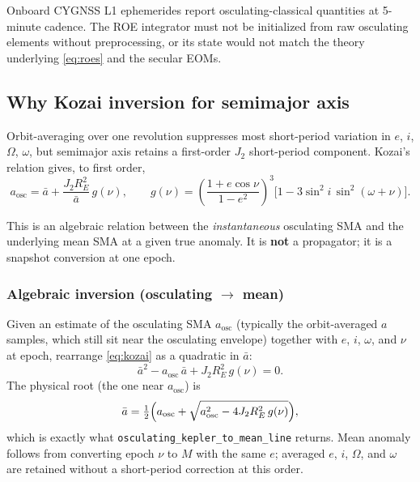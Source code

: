 \documentclass[11pt]{article}
\begin{document}
Onboard CYGNSS L1 ephemerides report osculating-classical quantities at 5-minute cadence. The ROE integrator must not be initialized from raw osculating elements without preprocessing, or its state would not match the theory underlying \eqref{eq:roes} and the secular EOMs.

\subsection{Why Kozai inversion for semimajor axis}

Orbit-averaging over one revolution suppresses most short-period variation in $e$, $i$, $\Omega$, $\omega$, but semimajor axis retains a first-order $J_2$ short-period component. Kozai's relation gives, to first order,
\begin{equation}
a_\mathrm{osc} = \bar{a} + \frac{J_2 R_E^2}{\bar{a}}\,g(\nu),
\qquad
g(\nu) =
\left(\frac{1+e\cos\nu}{1-e^2}\right)^{\!3}
\bigl[1 - 3\sin^2 i\,\sin^2(\omega+\nu)\bigr].
\label{eq:kozai}
\end{equation}

This is an algebraic relation between the \emph{instantaneous} osculating SMA and the underlying mean SMA at a given true anomaly. It is \textbf{not} a propagator; it is a snapshot conversion at one epoch.

\subsubsection{Algebraic inversion (osculating $\to$ mean)}

Given an estimate of the osculating SMA $a_\mathrm{osc}$ (typically the orbit-averaged $a$ samples, which still sit near the osculating envelope) together with $e$, $i$, $\omega$, and $\nu$ at epoch, rearrange \eqref{eq:kozai} as a quadratic in $\bar{a}$:
\begin{equation}
\bar{a}^2 - a_\mathrm{osc}\,\bar{a} + J_2 R_E^2\,g(\nu) = 0.
\end{equation}
The physical root (the one near $a_\mathrm{osc}$) is
\begin{equation}
\bar{a} = \tfrac{1}{2}\Bigl(a_\mathrm{osc} + \sqrt{a_\mathrm{osc}^2 - 4 J_2 R_E^2\,g(\nu)}\Bigr),
\end{equation}
which is exactly what \texttt{osculating\_kepler\_to\_mean\_line} returns. Mean anomaly follows from converting epoch $\nu$ to $M$ with the same $e$; averaged $e$, $i$, $\Omega$, and $\omega$ are retained without a short-period correction at this order.
\end{document}
